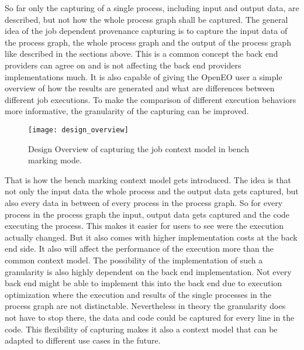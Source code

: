 \documentclass[draft,final]{vutinfth} %
\begin{document}
So far only the capturing of a single process, including input and output data, are described, but not how the whole process graph shall be captured. The general idea of the job dependent provenance capturing is to capture the input data of the process graph, the whole process graph and the output of the process graph like described in the sections above. This is a common concept the back end providers can agree on and is not affecting the back end providers implementations much. It is also capable of giving the OpenEO user a simple overview of how the results are generated and what are differences between different job executions. 
To make the comparison of different execution behaviors more informative, the granularity of the capturing can be improved. 

\begin{figure}[h]
	\centering
	\texttt{[image: design\_overview]}
	\caption{Design Overview of capturing the job context model in bench marking mode.}
	\label{fig:design_overview} %
\end{figure}
That is how the bench marking context model gets introduced. The idea is that not only the input data the whole process and the output data gets captured, but also every data in between of every process in the process graph. So for every process in the process graph the input, output data gets captured and the code executing the process. This makes it easier for users to see were the execution actually changed. But it also comes with higher implementation costs at the back end side. It also will affect the performance of the execution more than the common context model. The possibility of the implementation of such a granularity is also highly dependent on the back end implementation. Not every back end might be able to implement this into the back end due to execution optimization where the execution and results of the single  processes in the process graph are not distinctable. Nevertheless in theory the granularity does not have to stop there, the data and code could be captured for every line in the code. This flexibility of capturing makes it also a context model that  can be adapted to different use cases in the future.  

\backmatter

\listoffigures %

\cleardoublepage %
\listoftables %


\printindex

\printglossaries



\end{document}
